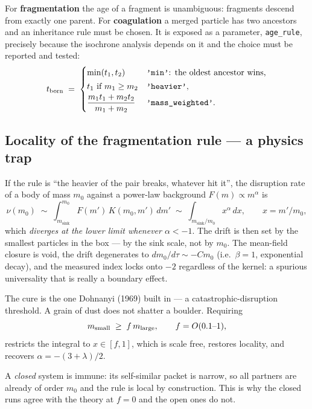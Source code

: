 \documentclass[a4paper,12pt]{article}
\newcommand{\msink}{m_{\mathrm{sink}}}
\newcommand{\code}[1]{\texttt{#1}}
\begin{document}
For \textbf{fragmentation} the age of a fragment is unambiguous: fragments
descend from exactly one parent. For \textbf{coagulation} a merged particle
has two ancestors and an inheritance rule must be chosen. It is exposed as a
parameter, \code{age\_rule}, precisely because the isochrone analysis depends
on it and the choice must be reported and tested:
\[
  t_{\rm born} \;=\;
  \begin{cases}
    \min(t_1,t_2)                    & \text{\code{'min'}: the oldest ancestor wins,}\\[2pt]
    t_1 \ \text{if}\ m_1 \ge m_2     & \text{\code{'heavier'},}\\[2pt]
    \dfrac{m_1 t_1 + m_2 t_2}{m_1+m_2} & \text{\code{'mass\_weighted'}.}
  \end{cases}
\]

\subsection{Locality of the fragmentation rule --- a physics trap}
\label{sec:trick8}

If the rule is ``the heavier of the pair breaks, whatever hit it'', the
disruption rate of a body of mass $m_0$ against a power-law background
$F(m) \propto m^{\alpha}$ is
\begin{equation}
  \nu(m_0) \;\sim\; \int_{\msink}^{m_0} F(m')\,K(m_0,m')\,dm'
           \;\sim\; \int_{\msink/m_0} x^{\alpha}\,dx ,
  \qquad x = m'/m_0 ,
\end{equation}
which \emph{diverges at the lower limit whenever $\alpha < -1$}. The drift is
then set by the smallest particles in the box --- by the sink scale, not by
$m_0$. The mean-field closure is void, the drift degenerates to
$dm_0/d\tau \sim -C m_0$ (i.e.\ $\beta = 1$, exponential decay), and the
measured index locks onto $-2$ regardless of the kernel: a spurious
universality that is really a boundary effect.

The cure is the one Dohnanyi (1969) built in --- a catastrophic-disruption
threshold. A grain of dust does not shatter a boulder. Requiring
\begin{equation}
  m_{\rm small} \;\ge\; f\,m_{\rm large},
  \qquad f = O(0.1\text{--}1),
\end{equation}
restricts the integral to $x \in [f,1]$, which is scale free, restores
locality, and recovers $\alpha = -(3+\lambda)/2$.

A \emph{closed} system is immune: its self-similar packet is narrow, so all
partners are already of order $m_0$ and the rule is local by construction.
This is why the closed runs agree with the theory at $f=0$ and the open ones
do not.
\end{document}
